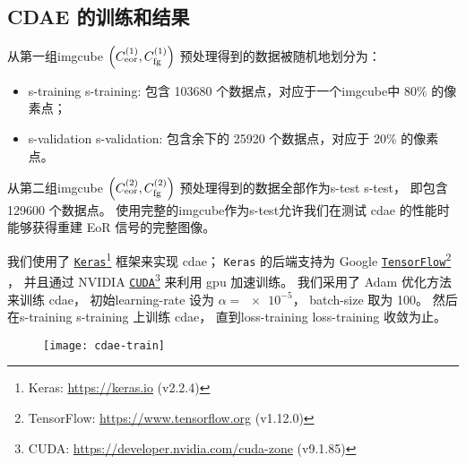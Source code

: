 \subsection{CDAE 的训练和结果}
\label{sec:cdae-results}

从第一组\ac{imgcube}
$\left( C_{\mathrm{eor}}^{(1)}, C_{\mathrm{fg}}^{(1)} \right)$
预处理得到的数据被随机地划分为：
\begin{itemize}
  \item \acl{s-training} \ac{s-training}:
    包含 \num{103680} 个数据点，对应于一个\ac{imgcube}中 80\% 的像素点；
  \item \acl{s-validation} \ac{s-validation}:
    包含余下的 \num{25920} 个数据点，对应于 20\% 的像素点。
\end{itemize}
从第二组\ac{imgcube}
$\left( C_{\mathrm{eor}}^{(2)}, C_{\mathrm{fg}}^{(2)} \right)$
预处理得到的数据全部作为\acl{s-test} \ac{s-test}，
即包含 \num{129600} 个数据点。
使用完整的\ac{imgcube}作为\acl{s-test}允许我们在测试 \ac{cdae}
的性能时能够获得重建 EoR 信号的完整图像。

我们使用了 \href{https://keras.io}{\texttt{Keras}}\footnote{%
  Keras: \url{https://keras.io} (v2.2.4)}
框架\cite{keras}来实现 \ac{cdae}；
\texttt{Keras} 的后端支持为 Google
\href{https://www.tensorflow.org}{\texttt{TensorFlow}}\footnote{%
  TensorFlow: \url{https://www.tensorflow.org} (v1.12.0)}
\cite{tensorflow}，
并且通过 NVIDIA
\href{https://developer.nvidia.com/cuda-zone}{\texttt{CUDA}}\footnote{%
  CUDA: \url{https://developer.nvidia.com/cuda-zone} (v9.1.85)}
来利用 \ac{gpu} 加速训练。
我们采用了 Adam 优化方法\cite{kingma2015} 来训练 \ac{cdae}，
初始\ac{learning-rate} 设为 $\alpha = \num{e-5}$，
\ac{batch-size} 取为 100。
然后在\acl{s-training} \ac{s-training} 上训练 \ac{cdae}，
直到\acl{loss-training} \ac{loss-training} 收敛为止。

\begin{figure}[htp]
  \centering
  \texttt{[image: cdae-train]}
  \label{fig:cdae-train}
\end{figure}

